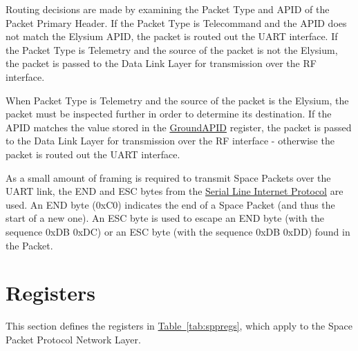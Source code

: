 \documentclass{hitec}
\newcommand{\tabref}[1]{\hyperref[tab:#1]{Table~\ref{tab:#1}}}
\begin{document}
Routing decisions are made by examining the Packet Type and APID of the Packet
Primary Header. If the Packet Type is Telecommand and the APID does not match
the Elysium APID, the packet is routed out the UART interface. If the Packet
Type is Telemetry and the source of the packet is not the Elysium, the packet
is passed to the Data Link Layer for transmission over the RF interface.

When Packet Type is Telemetry and the source of the packet is the Elysium,
the packet must be inspected further in
order to determine its destination. If the APID matches the value stored in the
\hyperref[reg:groundapid]{GroundAPID} register, the packet is passed to the
Data Link Layer for transmission over the RF interface - otherwise the packet
is routed out the UART interface.

As a small amount of framing is required to transmit Space Packets over the
UART link, the END and ESC bytes from the
\href{https://tools.ietf.org/html/rfc1055}{Serial Line Internet Protocol} are
used. An END byte (0xC0) indicates the end of a Space Packet (and thus the
start of a new one). An ESC byte is used to escape an END byte (with the
sequence 0xDB 0xDC) or an ESC byte (with the sequence 0xDB 0xDD) found in the
Packet.

\section{Registers}
\label{sec:sppregs}

This section defines the registers in \tabref{sppregs}, which apply to the
Space Packet Protocol Network Layer.
\end{document}
